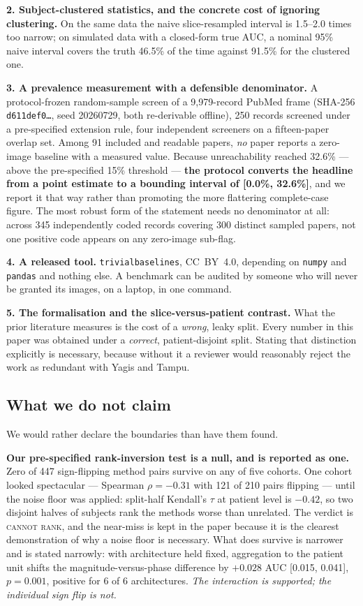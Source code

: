 \documentclass[11pt,a4paper]{article}
\begin{document}
\textbf{2. Subject-clustered statistics, and the concrete cost of ignoring
clustering.} On the same data the naive slice-resampled interval is 1.5--2.0 times too
narrow; on simulated data with a closed-form true AUC, a nominal 95\% naive interval
covers the truth 46.5\% of the time against 91.5\% for the clustered one.

\textbf{3. A prevalence measurement with a defensible denominator.} A protocol-frozen
random-sample screen of a 9{,}979-record PubMed frame (SHA-256 \texttt{d611def0\ldots},
seed 20260729, both re-derivable offline), 250 records screened under a pre-specified
extension rule, four independent screeners on a fifteen-paper overlap set. Among 91
included and readable papers, \emph{no} paper reports a zero-image baseline with a
measured value. Because unreachability reached 32.6\% --- above the pre-specified 15\%
threshold --- \textbf{the protocol converts the headline from a point estimate to a
bounding interval of [0.0\%, 32.6\%]}, and we report it that way rather than promoting
the more flattering complete-case figure. The most robust form of the statement needs
no denominator at all: across 345 independently coded records covering 300 distinct
sampled papers, not one positive code appears on any zero-image sub-flag.

\textbf{4. A released tool.} \texttt{trivialbaselines}, CC~BY~4.0, depending on
\texttt{numpy} and \texttt{pandas} and nothing else. A benchmark can be audited by
someone who will never be granted its images, on a laptop, in one command.

\textbf{5. The formalisation and the slice-versus-patient contrast.} What the prior
literature measures is the cost of a \emph{wrong}, leaky split. Every number in this
paper was obtained under a \emph{correct}, patient-disjoint split. Stating that
distinction explicitly is necessary, because without it a reviewer would reasonably
reject the work as redundant with Yagis and Tampu.

\subsection*{What we do not claim}

We would rather declare the boundaries than have them found.

\textbf{Our pre-specified rank-inversion test is a null, and is reported as one.} Zero
of 447 sign-flipping method pairs survive on any of five cohorts. One cohort looked
spectacular --- Spearman $\rho = -0.31$ with 121 of 210 pairs flipping --- until the
noise floor was applied: split-half Kendall's $\tau$ at patient level is $-0.42$, so
two disjoint halves of subjects rank the methods worse than unrelated. The verdict is
\textsc{cannot rank}, and the near-miss is kept in the paper because it is the clearest
demonstration of why a noise floor is necessary. What does survive is narrower and is
stated narrowly: with architecture held fixed, aggregation to the patient unit shifts
the magnitude-versus-phase difference by $+0.028$ AUC [0.015, 0.041], $p = 0.001$,
positive for 6 of 6 architectures. \emph{The interaction is supported; the individual
sign flip is not.}
\end{document}
